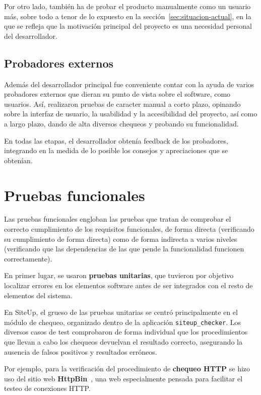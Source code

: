 Por otro lado, también ha de probar el producto manualmente como un usuario más,
sobre todo a tenor de lo expuesto en la sección~\ref{sec:situacion-actual}, en
la que se refleja que la motivación principal del proyecto es una necesidad
personal del desarrollador.

\subsection{Probadores externos}

Además del desarrollador principal fue conveniente contar con la ayuda de varios
probadores externos que dieran su punto de vista sobre el software, como
usuarios. Así, realizaron pruebas de caracter manual a corto plazo, opinando
sobre la interfaz de usuario, la usabilidad y la accesibilidad del proyecto, así
como a largo plazo, dando de alta diversos chequeos y probando su funcionalidad.

En todas las etapas, el desarrollador obtenía feedback de los probadores,
integrando en la medida de lo posible los consejos y apreciaciones que se obtenían.


\section{Pruebas funcionales}

Las pruebas funcionales engloban las pruebas que tratan de comprobar el correcto
cumplimiento de los requisitos funcionales, de forma directa (verificando su
cumplimiento de forma directa) como de forma indirecta a varios niveles
(verificando que las dependencias de las que pende la funcionalidad funcionen
correctamente).

En primer lugar, se usaron \textbf{pruebas unitarias}, que tuvieron por objetivo
localizar errores en los elementos software antes de ser integrados con el resto
de elementos del sistema.

En SiteUp, el grueso de las pruebas unitarias se centró principalmente en el
módulo de chequeo, organizado dentro de la aplicación
\texttt{siteup\_checker}. Los diversos casos de test comprobaron de forma
individual que los procedimientos que llevan a cabo los chequeos devuelvan el
resultado correcto, asegurando la ausencia de falsos positivos y resultados
erróneos.

Por ejemplo, para la verificación del procedimiento de \textbf{chequeo HTTP} se
hizo uso del sitio web \textbf{HttpBin}~\cite{httpbin}, una web especialmente
pensada para facilitar el testeo de conexiones HTTP. 

